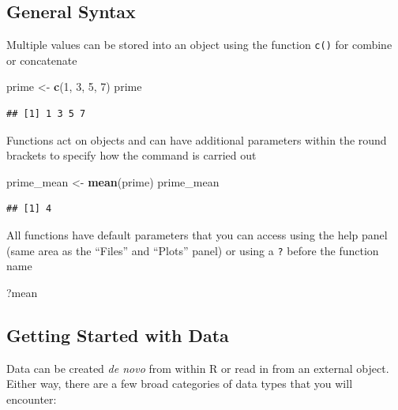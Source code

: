 \documentclass[
]{book}
\newenvironment{Shaded}{\begin{snugshade}}{\end{snugshade}}
\newcommand{\DecValTok}[1]{\textcolor[rgb]{0.00,0.00,0.81}{#1}}
\newcommand{\FunctionTok}[1]{\textcolor[rgb]{0.13,0.29,0.53}{\textbf{#1}}}
\newcommand{\NormalTok}[1]{#1}
\newcommand{\OtherTok}[1]{\textcolor[rgb]{0.56,0.35,0.01}{#1}}
\begin{document}
\subsection{General Syntax}\label{general-syntax}

Multiple values can be stored into an object using the function \texttt{c()} for combine or concatenate

\begin{Shaded}
\begin{Highlighting}[]
\NormalTok{prime }\OtherTok{\textless{}{-}} \FunctionTok{c}\NormalTok{(}\DecValTok{1}\NormalTok{, }\DecValTok{3}\NormalTok{, }\DecValTok{5}\NormalTok{, }\DecValTok{7}\NormalTok{)}
\NormalTok{prime}
\end{Highlighting}
\end{Shaded}

\begin{verbatim}
## [1] 1 3 5 7
\end{verbatim}

Functions act on objects and can have additional parameters within the round brackets to specify how the command is carried out

\begin{Shaded}
\begin{Highlighting}[]
\NormalTok{prime\_mean }\OtherTok{\textless{}{-}} \FunctionTok{mean}\NormalTok{(prime)}
\NormalTok{prime\_mean}
\end{Highlighting}
\end{Shaded}

\begin{verbatim}
## [1] 4
\end{verbatim}

All functions have default parameters that you can access using the help panel (same area as the ``Files'' and ``Plots'' panel) or using a \texttt{?} before the function name

\begin{Shaded}
\begin{Highlighting}[]
\NormalTok{?mean}
\end{Highlighting}
\end{Shaded}

\subsection{Getting Started with Data}\label{getting-started-with-data}

Data can be created \emph{de novo} from within R or read in from an external object. Either way, there are a few broad categories of data types that you will encounter:
\end{document}
